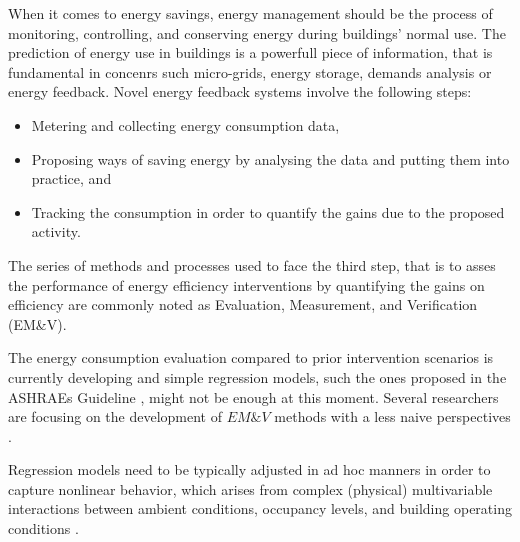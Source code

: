 \documentclass[10pt, conference, compsocconf]{IEEEtran}
\begin{document}
When it comes to energy savings, energy management should be the process of monitoring, controlling, and conserving energy during buildings' normal use.  The prediction of energy use in buildings is a powerfull piece of information, that is fundamental in concenrs such micro-grids, energy storage, demands analysis or energy feedback. Novel energy feedback systems involve the following steps:

\begin{itemize}
\item Metering and collecting energy consumption data,
\item Proposing ways of saving energy by analysing the data and putting them into practice, and
\item Tracking the consumption in order to quantify the gains due to the proposed activity.
\end{itemize}


The series of methods and processes used to face the third step, that is to asses the performance of energy efficiency interventions by quantifying the gains on efficiency are commonly noted as Evaluation, Measurement, and Verification (EM\&V). 



The energy consumption evaluation compared to prior intervention scenarios is currently developing and  simple regression models, such the ones proposed in the ASHRAEs Guideline \cite{ashrae2002ashrae}, might not be enough at this moment. Several researchers are focusing on the development of $EM\&V$  methods with a less naive perspectives \cite{ramalloidentifying}. 


Regression models need to be typically adjusted in ad hoc manners in order to capture nonlinear behavior, which arises from complex (physical) multivariable interactions between ambient conditions, occupancy levels, and building operating conditions \cite{heo2012gaussian}.
\end{document}
